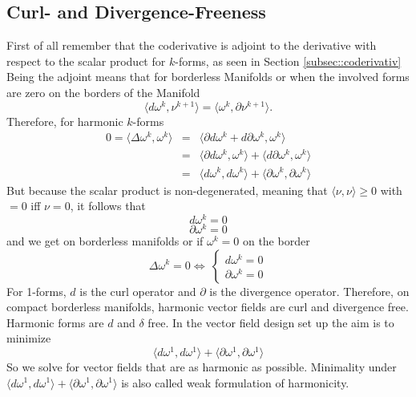 \subsection{Curl- and Divergence-Freeness}
First of all remember that the coderivative is adjoint to the derivative with respect to the scalar product for $k$-forms, as seen in Section \ref{subsec::coderivativ}
Being the adjoint means that for borderless Manifolds or when the involved forms are zero on the borders of the Manifold
\[\langle d\omega^k, \nu^{k+1} \rangle = \langle \omega^k,\partial\nu^{k+1}\rangle.\]
Therefore, for harmonic $k$-forms
\begin{eqnarray*}0=\langle\Delta\omega^k,\omega^k\rangle &= &\langle \partial d\omega^k + d \partial \omega^k, \omega^k\rangle \\
 &=& \langle \partial d\omega^k, \omega^k\rangle + \langle d \partial \omega^k, \omega^k\rangle \\
 &=& \langle d\omega^k,d\omega^k\rangle + \langle \partial\omega^k,\partial\omega^k\rangle
\end{eqnarray*}
But because the scalar product is non-degenerated, meaning that $\langle \nu,\nu\rangle \geq 0$  with $=0$ iff $\nu=0$, it follows that
\[d\omega^k = 0\]
\[\partial\omega^k = 0\]
and we get on borderless manifolds or if $\omega^k = 0$ on the border
\[\Delta \omega^k = 0 \Leftrightarrow \: \left\{\begin{matrix}
d\omega^k = 0\\
\partial \omega^k = 0
\end{matrix}\right.\]
For 1-forms, $d$ is the curl operator and $\partial$ is the divergence operator. Therefore, on compact borderless manifolds, harmonic vector fields are curl and divergence free. Harmonic forms are $d$ and $\delta$ free. 
In the vector field design set up the aim is to minimize
$$\langle d\omega^1,d\omega^1\rangle + \langle \partial\omega^1,\partial\omega^1\rangle$$
So we solve for vector fields that are as harmonic as possible. Minimality under $\langle d\omega^1,d\omega^1\rangle + \langle \partial\omega^1,\partial\omega^1\rangle$ is also called weak formulation of harmonicity.

